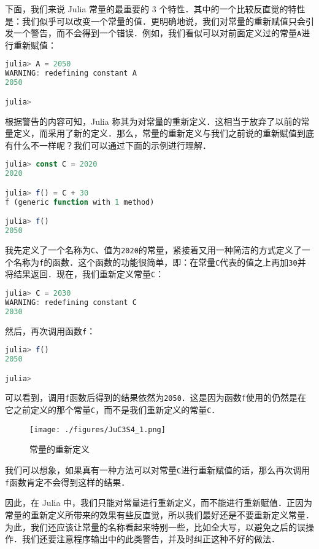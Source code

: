 下面，我们来说 Julia 常量的最重要的 3 个特性．其中的一个比较反直觉的特性是：我们似乎可以改变一个常量的值．更明确地说，我们对常量的重新赋值只会引发一个警告，而不会得到一个错误．例如，我们看似可以对前面定义过的常量\verb|A|进行重新赋值：

\begin{lstlisting}[language=julia]
julia> A = 2050
WARNING: redefining constant A
2050

julia> 
\end{lstlisting}

根据警告的内容可知，Julia 称其为对常量的重新定义．这相当于放弃了以前的常量定义，而采用了新的定义．那么，常量的重新定义与我们之前说的重新赋值到底有什么不一样呢？我们可以通过下面的示例进行理解．

\begin{lstlisting}[language=julia]
julia> const C = 2020 
2020

julia> f() = C + 30
f (generic function with 1 method)

julia> f()
2050
\end{lstlisting}

我先定义了一个名称为\verb|C|、值为\verb|2020|的常量，紧接着又用一种简洁的方式定义了一个名称为\verb|f|的函数．这个函数的功能很简单，即：在常量\verb|C|代表的值之上再加\verb|30|并将结果返回．现在，我们重新定义常量\verb|C|：

\begin{lstlisting}[language=julia]
julia> C = 2030
WARNING: redefining constant C
2030
\end{lstlisting}

然后，再次调用函数\verb|f|：

\begin{lstlisting}[language=julia]
julia> f()
2050

julia> 
\end{lstlisting}

可以看到，调用\verb|f|函数后得到的结果依然为\verb|2050|．这是因为函数\verb|f|使用的仍然是在它之前定义的那个常量\verb|C|，而不是我们重新定义的常量\verb|C|．

\begin{figure}[ht]
\centering
\texttt{[image: ./figures/JuC3S4\_1.png]}
\caption{常量的重新定义} \label{JuC3S4_fig1}
\end{figure}

我们可以想象，如果真有一种方法可以对常量\verb|C|进行重新赋值的话，那么再次调用\verb|f|函数肯定不会得到这样的结果．

因此，在 Julia 中，我们只能对常量进行重新定义，而不能进行重新赋值．正因为常量的重新定义所带来的效果有些反直觉，所以我们最好还是不要重新定义常量．为此，我们还应该让常量的名称看起来特别一些，比如全大写，以避免之后的误操作．我们还要注意程序输出中的此类警告，并及时纠正这种不好的做法．

